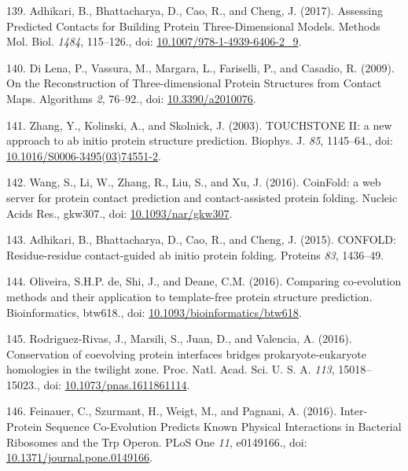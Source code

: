 \documentclass[11pt,a4paper,twoside]{book}
\theoremstyle{definition}
\theoremstyle{definition}
\theoremstyle{remark}
\begin{document}
\hypertarget{ref-Adhikari2017}{}
139. Adhikari, B., Bhattacharya, D., Cao, R., and Cheng, J. (2017).
Assessing Predicted Contacts for Building Protein Three-Dimensional
Models. Methods Mol. Biol. \emph{1484}, 115--126., doi:
\href{https://doi.org/10.1007/978-1-4939-6406-2_9}{10.1007/978-1-4939-6406-2\_9}.

\hypertarget{ref-DiLena2009a}{}
140. Di Lena, P., Vassura, M., Margara, L., Fariselli, P., and Casadio,
R. (2009). On the Reconstruction of Three-dimensional Protein Structures
from Contact Maps. Algorithms \emph{2}, 76--92., doi:
\href{https://doi.org/10.3390/a2010076}{10.3390/a2010076}.

\hypertarget{ref-Zhang2003}{}
141. Zhang, Y., Kolinski, A., and Skolnick, J. (2003). TOUCHSTONE II: a
new approach to ab initio protein structure prediction. Biophys. J.
\emph{85}, 1145--64., doi:
\href{https://doi.org/10.1016/S0006-3495(03)74551-2}{10.1016/S0006-3495(03)74551-2}.

\hypertarget{ref-Wang2016}{}
142. Wang, S., Li, W., Zhang, R., Liu, S., and Xu, J. (2016). CoinFold:
a web server for protein contact prediction and contact-assisted protein
folding. Nucleic Acids Res., gkw307., doi:
\href{https://doi.org/10.1093/nar/gkw307}{10.1093/nar/gkw307}.

\hypertarget{ref-Adhikari2015a}{}
143. Adhikari, B., Bhattacharya, D., Cao, R., and Cheng, J. (2015).
CONFOLD: Residue-residue contact-guided ab initio protein folding.
Proteins \emph{83}, 1436--49.

\hypertarget{ref-DeOliveira2016}{}
144. Oliveira, S.H.P. de, Shi, J., and Deane, C.M. (2016). Comparing
co-evolution methods and their application to template-free protein
structure prediction. Bioinformatics, btw618., doi:
\href{https://doi.org/10.1093/bioinformatics/btw618}{10.1093/bioinformatics/btw618}.

\hypertarget{ref-Rodriguez-Rivas2016}{}
145. Rodriguez-Rivas, J., Marsili, S., Juan, D., and Valencia, A.
(2016). Conservation of coevolving protein interfaces bridges
prokaryote-eukaryote homologies in the twilight zone. Proc. Natl. Acad.
Sci. U. S. A. \emph{113}, 15018--15023., doi:
\href{https://doi.org/10.1073/pnas.1611861114}{10.1073/pnas.1611861114}.

\hypertarget{ref-Feinauer2016a}{}
146. Feinauer, C., Szurmant, H., Weigt, M., and Pagnani, A. (2016).
Inter-Protein Sequence Co-Evolution Predicts Known Physical Interactions
in Bacterial Ribosomes and the Trp Operon. PLoS One \emph{11},
e0149166., doi:
\href{https://doi.org/10.1371/journal.pone.0149166}{10.1371/journal.pone.0149166}.
\end{document}
